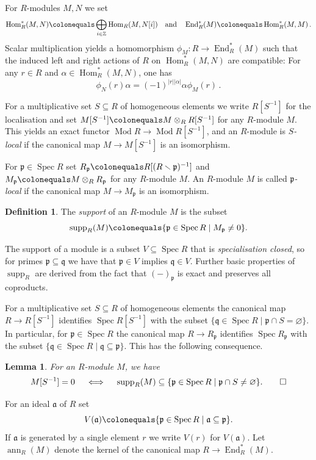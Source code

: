 \documentclass{amsart}[a4]
\newtheorem{lemma}[theorem]{Lemma}
\theoremstyle{definition}
\newtheorem{definition}[theorem]{Definition}
\theoremstyle{remark}
\numberwithin{equation}{section}
\newcommand{\ann}{\operatorname{ann}}
\newcommand{\End}{\operatorname{End}}
\newcommand{\Hom}{\operatorname{Hom}}
\newcommand{\Mod}{\operatorname{Mod}}
\newcommand{\Spec}{\operatorname{Spec}}
\newcommand{\supp}{\operatorname{supp}}
\newcommand{\bbZ}{\mathbb Z}
\newcommand{\fa}{\mathfrak{a}}
\newcommand{\fp}{\mathfrak{p}}
\newcommand{\fq}{\mathfrak{q}}
\begin{document}
For $R$-modules $M,N$ we set
\[ \Hom_{R}^*(M,N)\colonequals \bigoplus_{i\in\bbZ}\Hom_{R}(M,N[i]) \quad \text{and}\quad
  \End_{R}^{*}(M)\colonequals \Hom_{R}^{*}(M,M)\,.\] Scalar
multiplication yields a  homomorphism
$\phi_M\colon R\to \End^*_R(M)$ such that the induced left and right
actions of $R$ on $\Hom_R^{*}(M,N)$ are compatible: For any $r\in R$
and $\alpha\in\Hom^*_R(M,N)$, one has
\[ \phi_N(r)\alpha=(-1)^{|r||\alpha|}\alpha\phi_M(r)\,.
\]

For a multiplicative set $S\subseteq R$ of homogeneous elements we
write $R[S^{-1}]$ for the localisation and set
$M[S^{-1}]\colonequals M\otimes_R R[S^{-1}]$ for any $R$-module
$M$. This yields an exact functor $\Mod R\to \Mod R[S^{-1}]$, and an
$R$-module is \emph{$S$-local} if the canonical map $M\to M[S^{-1}]$
is an isomorphism.

For $\fp\in\Spec R$ set $R_\fp\colonequals R[(R\smallsetminus \fp)^{-1}]$
and $M_\fp\colonequals M\otimes_R R_\fp$ for any $R$-module $M$. An
$R$-module $M$ is called \emph{$\fp$-local} if the canonical map
$M\to M_\fp$ is an isomorphism.

\begin{definition}
  The \emph{support} of an $R$-module $M$ is the
  subset \[\supp_R(M)\colonequals\{\fp\in\Spec R\mid M_\fp\neq 0\}.\]
\end{definition}

The support of a module is a subset $V\subseteq\Spec R$ that is
\emph{specialisation closed}, so for primes $\fp\subseteq\fq$ we have
that $\fp\in V$ implies $\fq\in V$. Further basic properties of
$\supp_R$ are derived from the fact that $(-)_\fp$ is exact and
preserves all coproducts.


For a multiplicative set $S\subseteq R$ of homogeneous elements the
canonical map $R\to R[S^{-1}]$ identifies $\Spec R[S^{-1}]$ with the
subset $\{\fq\in\Spec R\mid \fp\cap S=\varnothing\}$.  In particular,
for $\fp\in\Spec R$ the canonical map $R\to R_\fp$ identifies
$\Spec R_\fp$ with the subset $\{\fq\in\Spec R\mid
\fq\subseteq\fp\}$. This has the following consequence.

\begin{lemma}\pushQED{\qed} 
  For an $R$-module $M$, we have
  \[M[S^{-1}]=0\quad\iff \quad\supp_R(M)\subseteq\{\fp\in\Spec R\mid \fp\cap S\neq\varnothing\}.\qedhere\]
\end{lemma}


For an ideal $\fa$ of $R$ set
\[V(\fa)\colonequals\{\fp\in\Spec R\mid \fa\subseteq\fp\}.\] If $\fa$ is
generated by a single element $r$ we write $V(r)$ for $V(\fa)$. Let
$\ann_R(M)$ denote the kernel of the canonical map $R\to \End^*_R(M)$.
\end{document}
